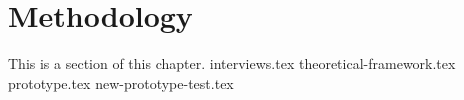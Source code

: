 
\section{Methodology}
This is a section of this chapter.
{interviews.tex}
{theoretical-framework.tex}
{prototype.tex}
{new-prototype-test.tex}
